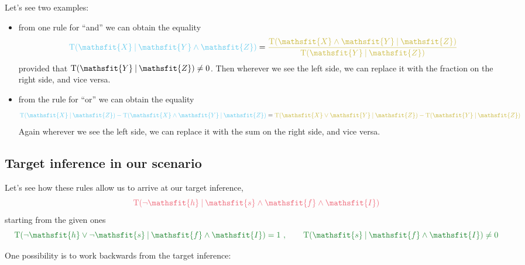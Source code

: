 \documentclass[
  a4paper,
  DIV=11,
  numbers=noendperiod,
  oneside]{scrreprt}
\begin{document}
Let's see two examples:

\begin{itemize}
\item
  from one rule for ``and'' we can obtain the equality \[
  {\color[RGB]{102,204,238}\mathrm{T}(\mathsfit{X}\nonscript\:\vert\nonscript\:\mathopen{} \mathsfit{Y}\land \mathsfit{Z})}
  =\color[RGB]{204,187,68}\frac{\mathrm{T}(\mathsfit{X}\land \mathsfit{Y}\nonscript\:\vert\nonscript\:\mathopen{} \mathsfit{Z})}{\mathrm{T}(\mathsfit{Y}\nonscript\:\vert\nonscript\:\mathopen{} \mathsfit{Z})}
  \] provided that
  \(\mathrm{T}(\mathsfit{Y}\nonscript\:\vert\nonscript\:\mathopen{} \mathsfit{Z}) \ne 0\).
  Then wherever we see the {left side}, we can replace it with the
  fraction on the {right side}, and vice versa.
\item
  from the rule for ``or'' we can obtain the equality \[
  {\color[RGB]{102,204,238}
  \mathrm{T}(\mathsfit{X}\nonscript\:\vert\nonscript\:\mathopen{} \mathsfit{Z}) - \mathrm{T}(\mathsfit{X}\land \mathsfit{Y}\nonscript\:\vert\nonscript\:\mathopen{} \mathsfit{Z})}
  =\color[RGB]{204,187,68}
  \mathrm{T}(\mathsfit{X}\lor \mathsfit{Y}\nonscript\:\vert\nonscript\:\mathopen{} \mathsfit{Z}) - \mathrm{T}(\mathsfit{Y}\nonscript\:\vert\nonscript\:\mathopen{} \mathsfit{Z})
  \] Again wherever we see the {left side}, we can replace it with the
  sum on the {right side}, and vice versa.
\end{itemize}

\hypertarget{target-inference-in-our-scenario}{%
\subsection{Target inference in our
scenario}\label{target-inference-in-our-scenario}}

Let's see how these rules allow us to arrive at our target inference, \[
\color[RGB]{238,102,119}\mathrm{T}(\lnot\mathsfit{h}\nonscript\:\vert\nonscript\:\mathopen{} \mathsfit{s}\land \mathsfit{f}\land \mathsfit{I})
\] starting from the given ones \[
\color[RGB]{34,136,51}\mathrm{T}(\lnot\mathsfit{h}\lor \lnot\mathsfit{s}\nonscript\:\vert\nonscript\:\mathopen{} \mathsfit{f}\land \mathsfit{I}) = 1
\ ,
\qquad
\mathrm{T}(\mathsfit{s}\nonscript\:\vert\nonscript\:\mathopen{} \mathsfit{f}\land \mathsfit{I}) \ne 0
\]

One possibility is to work backwards from the target inference:
\end{document}
